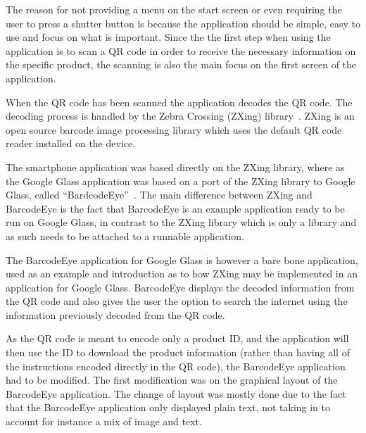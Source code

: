 The reason for not providing a menu on the start screen or even requiring the user to press a shutter button is because the application should be simple, easy to use and focus on what is important. Since the the first step when using the application is to scan a QR code in order to receive the necessary information on the specific product, the scanning is also the main focus on the first screen of the application.

When the QR code has been scanned the application decodes the QR code. The decoding process is handled by the Zebra Crossing (ZXing) library~\cite{zxing}. ZXing is an open source barcode image processing library which uses the default QR code reader installed on the device.

The smartphone application was based directly on the ZXing library, where as the Google Glass application was based on a port of the ZXing library to Google Glass, called ``BardcodeEye''~\cite{barcodeEye}. The main difference between ZXing and BarcodeEye is the fact that BarcodeEye is an example application ready to be run on Google Glass, in contrast to the ZXing library which is only a library and as such needs to be attached to a runnable application.

The BarcodeEye application for Google Glass is however a bare bone application, used as an example and introduction as to how ZXing may be implemented in an application for Google Glass. BarcodeEye displays the decoded information from the QR code and also gives the user the option to search the internet using the information previously decoded from the QR code.

As the QR code is meant to encode only a product ID, and the application will then use the ID to download the product information (rather than having all of the instructions encoded directly in the QR code), the BarcodeEye application had to be modified. The first modification was on the graphical layout of the BarcodeEye application. The change of layout was mostly done due to the fact that the BarcodeEye application only displayed plain text, not taking in to account for instance a mix of image and text.

